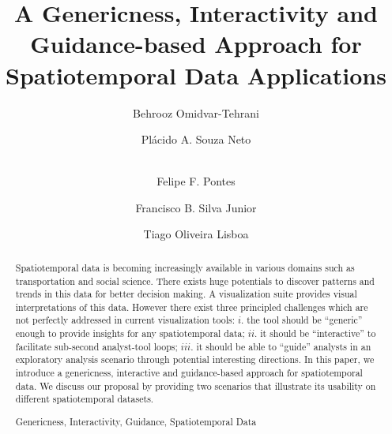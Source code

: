 \documentclass[runningheads,a4paper]{llncs}
\newcommand{\keywords}[1]{\par\addvspace\baselineskip
\noindent\keywordname\enspace\ignorespaces#1}
\begin{document}
\mainmatter  %

\title{A Genericness, Interactivity and Guidance-based Approach for Spatiotemporal Data Applications}


%
%
\author{Behrooz Omidvar-Tehrani \and Pl\'acido A. Souza Neto \and \\
Felipe F. Pontes \and Francisco B. Silva Junior \and Tiago Oliveira Lisboa}
%


%
%

\maketitle


\begin{abstract}
Spatiotemporal data is becoming increasingly available in various domains such as transportation and social science. There exists huge potentials to discover patterns and trends in this data for better decision making. A visualization suite provides visual interpretations of this data. However there exist three principled challenges which are not perfectly addressed in current visualization tools: $i.$  the tool should be ``generic'' enough to provide insights for any spatiotemporal data; $ii.$ it should be ``interactive'' to facilitate sub-second analyst-tool loops; $iii.$ it should be able to ``guide'' analysts in an exploratory analysis scenario through potential interesting directions. In this paper, we introduce a genericness, interactive and guidance-based approach for spatiotemporal data. We discuss our proposal by 
providing two scenarios that illustrate its usability on different spatiotemporal datasets.
\keywords{Genericness, Interactivity,  Guidance, Spatiotemporal Data}
\end{abstract}
\end{document}
